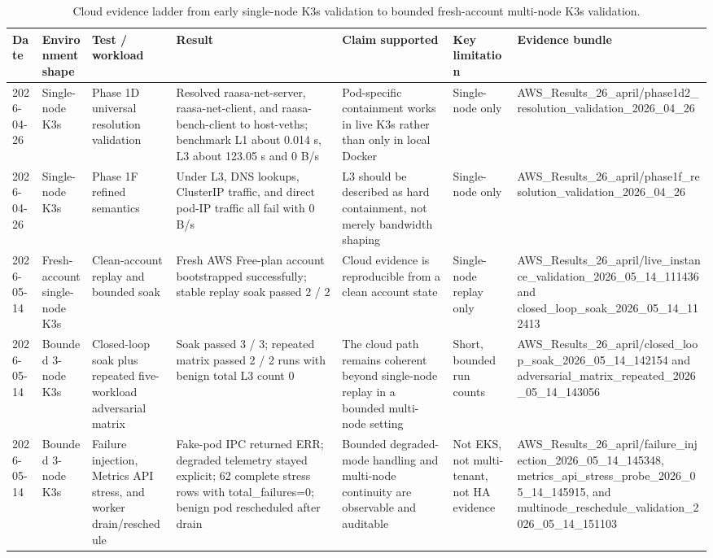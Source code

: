 \begin{table}[t]
\centering
\scriptsize
\setlength{\tabcolsep}{3.0pt}
\renewcommand{\arraystretch}{1.10}
\caption{Cloud evidence ladder from early single-node K3s validation to bounded fresh-account multi-node K3s validation.}
\label{tab:cloud-evidence-ladder}
\begin{tabularx}{\textwidth}{p{} p{} >{\raggedright\arraybackslash}X >{\raggedright\arraybackslash}X p{} p{} p{}}
\toprule
Date & Environment shape & Test / workload & Result & Claim supported & Key limitation & Evidence bundle \\
\midrule
2026-04-26 & Single-node K3s & Phase 1D universal resolution validation & Resolved raasa-net-server, raasa-net-client, and raasa-bench-client to host-veths; benchmark L1 about 0.014 s, L3 about 123.05 s and 0 B/s & Pod-specific containment works in live K3s rather than only in local Docker & Single-node only & AWS\_Results\_26\_april/phase1d2\_resolution\_validation\_2026\_04\_26 \\
2026-04-26 & Single-node K3s & Phase 1F refined semantics & Under L3, DNS lookups, ClusterIP traffic, and direct pod-IP traffic all fail with 0 B/s & L3 should be described as hard containment, not merely bandwidth shaping & Single-node only & AWS\_Results\_26\_april/phase1f\_resolution\_validation\_2026\_04\_26 \\
2026-05-14 & Fresh-account single-node K3s & Clean-account replay and bounded soak & Fresh AWS Free-plan account bootstrapped successfully; stable replay soak passed 2 / 2 & Cloud evidence is reproducible from a clean account state & Single-node replay only & AWS\_Results\_26\_april/live\_instance\_validation\_2026\_05\_14\_111436 and closed\_loop\_soak\_2026\_05\_14\_112413 \\
2026-05-14 & Bounded 3-node K3s & Closed-loop soak plus repeated five-workload adversarial matrix & Soak passed 3 / 3; repeated matrix passed 2 / 2 runs with benign total L3 count 0 & The cloud path remains coherent beyond single-node replay in a bounded multi-node setting & Short, bounded run counts & AWS\_Results\_26\_april/closed\_loop\_soak\_2026\_05\_14\_142154 and adversarial\_matrix\_repeated\_2026\_05\_14\_143056 \\
2026-05-14 & Bounded 3-node K3s & Failure injection, Metrics API stress, and worker drain/reschedule & Fake-pod IPC returned ERR; degraded telemetry stayed explicit; 62 complete stress rows with total\_failures=0; benign pod rescheduled after drain & Bounded degraded-mode handling and multi-node continuity are observable and auditable & Not EKS, not multi-tenant, not HA evidence & AWS\_Results\_26\_april/failure\_injection\_2026\_05\_14\_145348, metrics\_api\_stress\_probe\_2026\_05\_14\_145915, and multinode\_reschedule\_validation\_2026\_05\_14\_151103 \\
\bottomrule
\end{tabularx}
\end{table}

